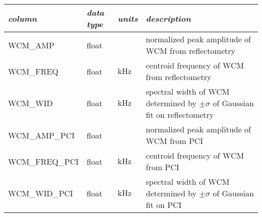 \begin{table*}
 \pushtooutside
 {\begin{tabu} to 143mm {X[2.348,l]X[1,c]X[1,c]X[4.348,c]}
   \toprule
   \emph{column} &
   \emph{data type} &
   \emph{units} &
   \emph{description}
   \\
   \midrule
   WCM\_AMP &
   float &
   &
   normalized peak amplitude of WCM from reflectometry
   \\
   WCM\_FREQ &
   float &
   $\si{\kilo\hertz}$ &
   centroid frequency of WCM from reflectometry
   \\
   WCM\_WID &
   float &
   $\si{\kilo\hertz}$ &
   spectral width of WCM determined by $\pm\sigma$ of Gaussian fit on reflectometry
   \\
   WCM\_AMP\_PCI &
   float &
   &
   normalized peak amplitude of WCM from PCI
   \\
   WCM\_FREQ\_PCI &
   float &
   $\si{\kilo\hertz}$ &
   centroid frequency of WCM from PCI
   \\
   WCM\_WID\_PCI &
   float &
   $\si{\kilo\hertz}$ &
   spectral width of WCM determined by $\pm\sigma$ of Gaussian fit on PCI
   \\
   \bottomrule
  \end{tabu}}
\end{table*}


\nicechapterending